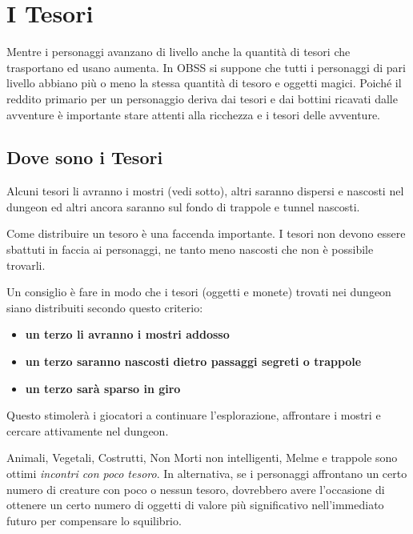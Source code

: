 \section{I Tesori}\label{disporretesori}

\begin{multicols}{2}

Mentre i personaggi avanzano di livello anche la quantità di tesori che trasportano ed usano aumenta. In OBSS si suppone che tutti i personaggi di pari livello abbiano più o meno la stessa quantità di tesoro e oggetti magici. Poiché il reddito primario per un personaggio deriva dai tesori e dai bottini ricavati dalle avventure è importante stare attenti alla ricchezza e i tesori delle avventure.

\subsection{Dove sono i Tesori}

Alcuni tesori li avranno i mostri (vedi sotto), altri saranno dispersi e nascosti nel dungeon ed altri ancora saranno sul fondo di trappole e tunnel nascosti.

Come distribuire un tesoro è una faccenda importante. I tesori non devono essere sbattuti in faccia ai personaggi, ne tanto meno nascosti che non è possibile trovarli.

Un consiglio è fare in modo che i tesori (oggetti e monete) trovati nei dungeon siano distribuiti secondo questo criterio:

\begin{itemize}[leftmargin=*] \setlength{\itemsep}{0pt}
\item \textbf{un terzo li avranno i mostri addosso}
\item \textbf{un terzo saranno nascosti dietro passaggi segreti o trappole}
\item \textbf{un terzo sarà sparso in giro}
\end{itemize}

Questo stimolerà i giocatori a continuare l'esplorazione, affrontare i mostri e cercare attivamente nel dungeon.

Animali, Vegetali, Costrutti, Non Morti non intelligenti, Melme e trappole sono ottimi \emph{incontri con poco tesoro}.
In alternativa, se i personaggi affrontano un certo numero di creature con poco o nessun tesoro, dovrebbero avere l'occasione di ottenere un certo numero di oggetti di valore più significativo nell'immediato futuro per compensare lo squilibrio. 


\end{multicols}
